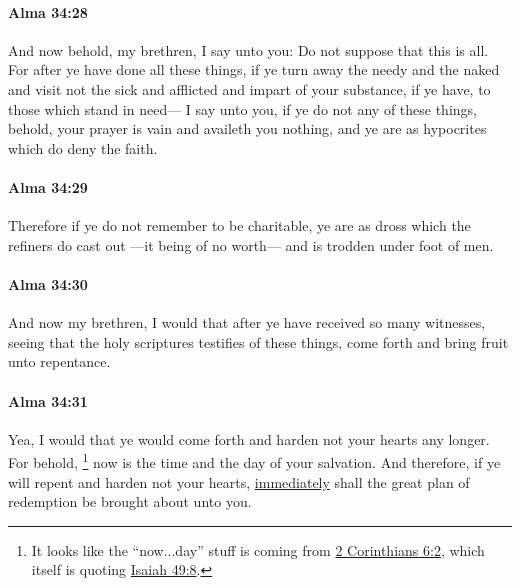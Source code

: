 		\paragraph{Alma 34:28} %
			\label{ALMA-34-28}

			And now behold, my brethren, I say unto you:
			Do not suppose that this is all.
			For after ye have done all these things,
			if ye turn away the needy and the naked
			and visit not the sick and afflicted
			and impart of your substance, if ye have,
			to those which stand in need---
			I say unto you,
			if ye do not any of these things,
			behold, your prayer is vain and availeth you nothing,
			and ye are as hypocrites which do deny the faith.

		\paragraph{Alma 34:29} %
			\label{ALMA-34-29}

			Therefore if ye do not remember to be charitable,
			ye are as dross which the refiners do cast out
			---it being of no worth---
			and is trodden under foot of men.

		\paragraph{Alma 34:30} %
			\label{ALMA-34-30}

			And now my brethren, I would that after ye have received so many witnesses,
			seeing that the holy scriptures testifies of these things,
			come forth and bring fruit unto repentance.

		\paragraph{Alma 34:31} %
			\label{ALMA-34-31}

			Yea, I would that ye would come forth and harden not your hearts any longer.
			For behold,
				\footnote{%
					It looks like the ``now...day'' stuff is coming from \hyperref[2CORINTHIANS-6-2]{2 Corinthians 6:2}, which itself is quoting \hyperref[ISAIAH-49-8]{Isaiah 49:8}.
					}%
			now is the time and the day of your salvation.
			And therefore, if ye will repent and harden not your hearts,
			\hyperref[IMMEDIATELY]{immediately} shall the great plan of redemption be brought about unto you.

